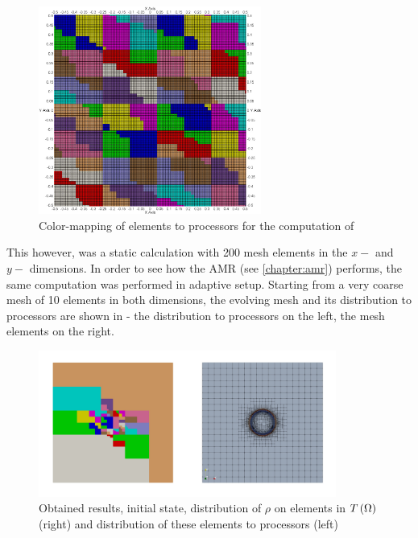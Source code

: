 \begin{figure}[H]
	\begin{center}
		\includegraphics[width=0.65\textwidth]{img/mhd-blast/old/subdomain.jpg}
	\caption{Color-mapping of elements to processors for the computation of }
	\label{figure:subdomainsBlastOld}
	\end{center}
\end{figure}
\vspace{-5mm}

This however, was a static calculation with 200 mesh elements in the $x-$ and $y-$ dimensions. In order to see how the AMR (see \cref{chapter:amr}) performs, the same computation was performed in adaptive setup. Starting from a very coarse mesh of 10 elements in both dimensions, the evolving mesh and its distribution to processors are shown in  - the distribution to processors on the left, the mesh elements on the right.

\begin{figure}[H]
	\begin{center}
		\includegraphics[width=0.87\textwidth]{img/mhd-blast/old/mya1.jpg}
	\caption{Obtained results, initial state, distribution of $\rho$ on elements in $T\left(\Omega\right)$ (right) and distribution of these elements to processors (left)}
	\label{figure:blastOldMyAdapt1}
	\end{center}
\end{figure}
\vspace{-8mm}

